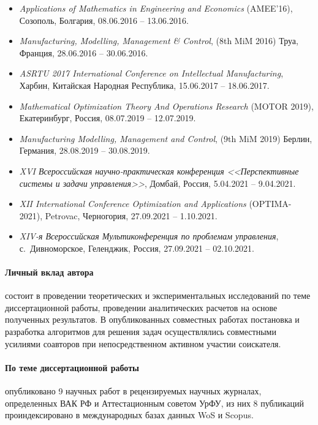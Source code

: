 \begin{itemize}
    \item
    \textit{Applications of Mathematics in Engineering and Economics}
    (AMEE'16),
    Созополь, Болгария,
    08.06.2016 -- 13.06.2016.
    \item
    \textit{Manufacturing, Modelling, Management \& Control},
    (8th MiM 2016)
    Труа, Франция,
    28.06.2016 -- 30.06.2016.
    \item
    \textit{ASRTU 2017 International Conference on Intellectual Manufacturing},
    Харбин, Китайская Народная Республика,
    15.06.2017 -- 18.06.2017.
    \item
    \textit{Mathematical Optimization Theory And Operations Research}
    (MOTOR 2019),
    Екатеринбург, Россия,
    08.07.2019 -- 12.07.2019.
    \item
    \textit{Manufacturing Modelling, Management and Control},
    (9th MiM 2019)
    Берлин, Германия,
    28.08.2019 -- 30.08.2019.
    \item
    \textit{XVI Всероссийская научно-практическая конференция
    <<Перспективные системы и задачи управления>>},
    Домбай, Россия,
    5.04.2021 -- 9.04.2021.
    \item
    \textit{XII International Conference Optimization and Applications}
    (OPTIMA-2021),
    Petrovac, Черногория,
    27.09.2021 -- 1.10.2021.
    \item
    \textit{XIV-я Всероссийская Мультиконференция по проблемам управления},
    с.~Дивноморское, Геленджик, Россия,
    27.09.2021 -- 02.10.2021.
\end{itemize}

\paragraph*{Личный вклад автора}
состоит в проведении теоретических и экспериментальных исследований
по теме диссертационной работы,
проведении аналитических расчетов на основе полученных результатов.
В опубликованных совместных работах постановка и разработка алгоритмов для
решения задач осуществлялись совместными усилиями соавторов
при непосредственном активном участии соискателя.

\paragraph*{По теме диссертационной работы}
опубликовано
9 научных работ
в рецензируемых научных журналах,
определенных ВАК РФ и
Аттестационным советом УрФУ,
из них
8 публикаций проиндексировано в международных базах данных
WoS и Scopus.
